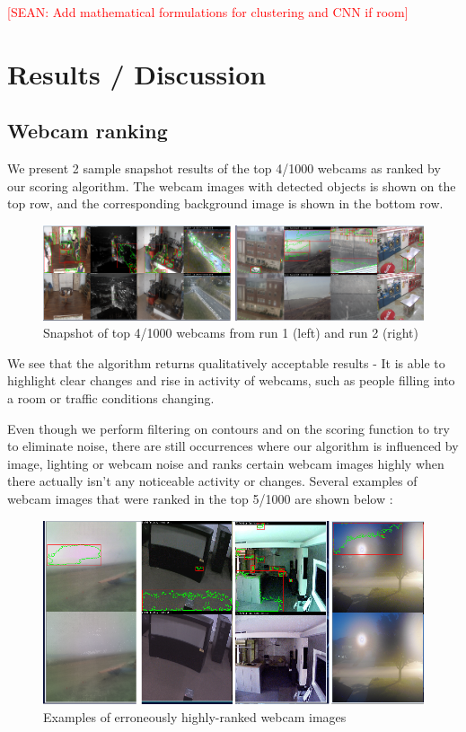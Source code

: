 \documentclass[10pt]{article} %
\begin{document}
\textcolor{red}{[SEAN: Add mathematical formulations for clustering and CNN if room]}

\section{Results / Discussion}
\subsection{Webcam ranking}
We present 2 sample snapshot results of the top 4/1000 webcams as ranked by our scoring algorithm. The webcam images with detected objects is shown on the top row, and the corresponding background image is shown in the bottom row. 
\begin{figure}[H]
\centering
\caption{Snapshot of top 4/1000 webcams from run 1 (left) and run 2 (right)}
\includegraphics[scale = 0.5]{wc}
\end{figure}
We see that the algorithm returns qualitatively acceptable results - It is able to highlight clear changes and rise in activity of webcams, such as people filling into a room or traffic conditions changing. 

Even though we perform filtering on contours and on the scoring function to try to eliminate noise, there are still occurrences where our algorithm is influenced by image, lighting or webcam noise and ranks certain webcam images highly when there actually isn't any noticeable activity or changes. Several examples of webcam images that were ranked in the top 5/1000 are shown below :
\begin{figure}[H]
\centering
\caption{Examples of erroneously highly-ranked webcam images}
\includegraphics[scale = 0.5]{fails}
\end{figure}
\end{document}
